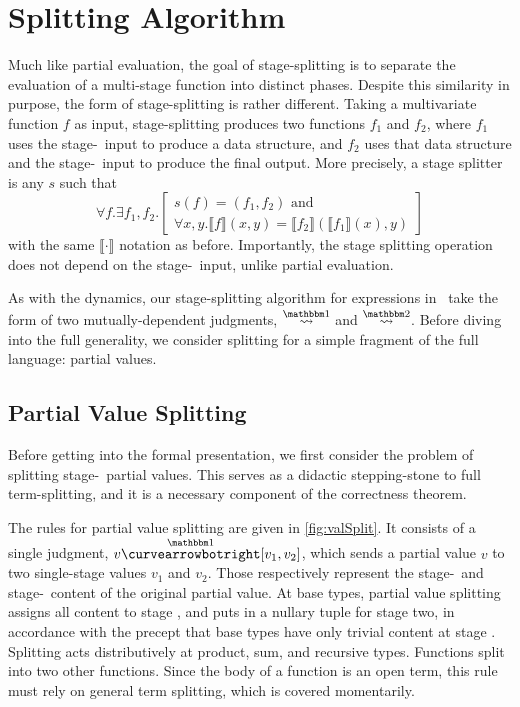 
\section{Splitting Algorithm}
\label{sec:splitting}

Much like partial evaluation, the goal of stage-splitting is to separate the evaluation of a multi-stage function into distinct phases.
Despite this similarity in purpose, the form of stage-splitting is rather different. 
Taking a multivariate function $f$ as input, stage-splitting produces two functions $f_1$ and $f_2$,
where $f_1$ uses the stage-\bbone\ input to produce a data structure, 
and $f_2$ uses that data structure and the stage-\bbtwo\ input to produce the final output.  
More precisely, a stage splitter is any $s$ such that
\[
	\forall f. \exists f_1,f_2. 
	\left[
		\begin{array}{l}
		s(f) = (f_1,f_2) \text{ and } \\
		\forall x,y.\llbracket f \rrbracket(x,y)=\llbracket f_2 \rrbracket(\llbracket f_1 \rrbracket(x),y)
		\end{array}
	\right]
\]
with the same $\llbracket \cdot \rrbracket$ notation as before.
Importantly, the stage splitting operation does not depend on the stage-\bbone\ input, unlike partial evaluation.

As with the dynamics, our stage-splitting algorithm for expressions in \lang\ take 
the form of two mutually-dependent judgments, $\splitonesym$ and $\splittwosym$. 
Before diving into the full generality, we consider splitting for a simple fragment of the full language: partial values.

\subsection{Partial Value Splitting}

Before getting into the formal presentation, 
we first consider the problem of splitting stage-\bbone\ partial values.
This serves as a didactic stepping-stone to full term-splitting, 
and it is a necessary component of the correctness theorem.

The rules for partial value splitting are given in \cref{fig:valSplit}.  It consists of a single judgment, $v \vsplito [v_1,v_2]$,
which sends a partial value $v$ to two single-stage values $v_1$ and $v_2$. 
Those respectively represent the stage-\bbone\ and stage-\bbtwo\ content of the original partial value.  
At base types, partial value splitting assigns all content to stage \bbone, and puts in a nullary tuple for stage two,
in accordance with the precept that base types have only trivial content at stage \bbtwo.
Splitting acts distributively at product, sum, and recursive types.
Functions split into two other functions.  Since the body of a function is an open term, this rule must rely on 
general term splitting, which is covered momentarily.

